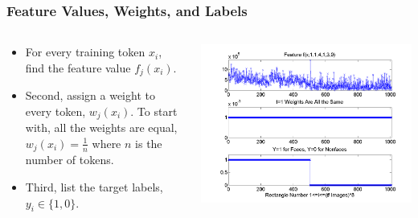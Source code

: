 \documentclass{beamer}
\begin{document}
\begin{frame}
  \frametitle{Feature Values, Weights, and Labels}
  \begin{columns}
    \begin{column}{0.4\textwidth}
      \begin{itemize}
      \item For every training token $x_i$, find the feature value
        $f_j(x_i)$.
      \item Second, assign a weight to every token, $w_j(x_i)$.  To
        start with, all the weights are equal, $w_j(x_i)=\frac{1}{n}$
        where $n$ is the number of tokens.
      \item Third, list the target labels, $y_i\in\{1,0\}$.
      \end{itemize}
    \end{column}
    \begin{column}{0.6\textwidth}
      \centerline{\includegraphics[width=\textwidth]{figs/features_weights_labels.png}}
    \end{column}
  \end{columns}
\end{frame}
      
\end{document}
